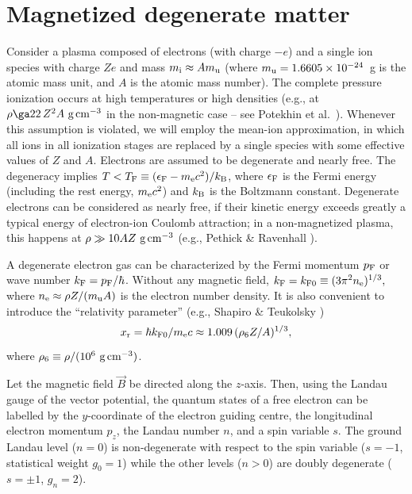 \documentclass{aa}
\newcommand{\gcc}{\mbox{~g\,cm$^{-3}$}}
\newcommand{\beq}{\begin{equation}}
\newcommand{\eeq}{\end{equation}}
\newcommand{\kB}{k_{\rm B}}
\newcommand{\mel}{m_{\rm e}}
\newcommand{\xr}{x_{\rm r}}
\newcommand{\EF}{\epsilon_{\rm F}}
\begin{document}
\section{Magnetized degenerate matter}
\label{sect-basics}
Consider a plasma composed 
of electrons (with charge $-e$)
and a single ion species with charge $Ze$
and mass $m_{\rm i}\approx Am_{\rm u}$ 
(where $m_{\rm u}=1.6605 \times 10^{-24}$~g is the atomic mass unit,
and $A$ is the atomic mass number).
The complete pressure ionization occurs at high temperatures or
high densities
(e.g., at $\rho\ga 22\,Z^2 A \gcc$ in the non-magnetic case
-- see Potekhin et al.\ \cite{pcy97}).
Whenever this assumption is violated, we will employ the
mean-ion approximation,
in which all ions in all ionization stages
are replaced by a single species
with some effective values of $Z$ and $A$.
Electrons are assumed to be degenerate and nearly free.
The degeneracy implies $T < T_{\rm F} \equiv (\EF-\mel c^2)/\kB$,
where $\EF$ is the Fermi energy
(including the rest energy, $\mel c^2$)
and $\kB$ is the Boltzmann constant.
Degenerate electrons can be considered as nearly free,
if their kinetic energy
exceeds greatly a typical energy of electron-ion Coulomb attraction;
in a non-magnetized plasma, this happens at $\rho \gg 10 A Z \gcc$
(e.g., Pethick \& Ravenhall \cite{pr95}).

A degenerate electron gas can be characterized by
the Fermi momentum $p_{\rm F}$ or wave number
$k_{\rm F}=p_{\rm F}/\hbar$. Without any magnetic field,
$
k_{\rm F}=k_{\rm F0} \equiv (3\pi^2 n_{\rm e})^{1/3},
$
where $n_{\rm e}\approx \rho Z/(m_{\rm u}A)$
is the electron number density.
It is also convenient to introduce
the ``relativity parameter'' (e.g., Shapiro \& Teukolsky \cite{ST83})
\beq
   \xr = \hbar k_{\rm F0}/\mel c \approx 1.009\,(\rho_6 Z/A)^{1/3},
\eeq
where $\rho_6 \equiv \rho/(10^6\gcc)$.

Let the magnetic field $\vec{B}$ be directed along
the $z$-axis. Then, using the Landau gauge of the vector
potential, the quantum states of a free
electron can be labelled by
the $y$-coordinate of the electron guiding centre,
the longitudinal electron momentum $p_z$,
the Landau number $n$,
and a spin variable $s$.
The ground Landau level ($n=0$) is non-degenerate with respect
to the spin variable ($s=-1$, statistical weight $g_0=1$)
while the other levels ($n>0$) are
doubly degenerate ($s=\pm1$, $g_n=2$).
\end{document}
